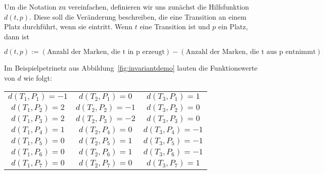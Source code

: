 		Um die Notation zu vereinfachen, definieren wir uns zunächst die Hilfsfunktion $d(t,p)$. Diese soll die Veränderung beschreiben, die eine Transition an einem Platz durchführt, wenn sie eintritt. Wenn $t$ eine Transition ist und $p$ ein Platz, dann ist 

		$$d(t,p) := (\text{Anzahl der Marken, die t in p erzeugt}) - (\text{Anzahl der Marken, die t aus p entnimmt})$$
		
		Im Beispielpetrinetz aus Abbildung~\ref{fig:invariantdemo} lauten die Funktionswerte von $d$ wie folgt:

		\begin{center}		
			\begin{tabular}{ccc}
				$d(T_1,P_1) = -1$ 	& $d(T_2,P_1) = 0$ 		& $d(T_3,P_1) = 1$ 		\\
				$d(T_1,P_2) = 2$ 	& $d(T_2,P_2) = -1$ 	& $d(T_3,P_2) = 0$ 		\\
				$d(T_1,P_3) = 2$ 	& $d(T_2,P_3) = -2$ 	& $d(T_3,P_3) = 0$ 		\\
				$d(T_1,P_4) = 1$ 	& $d(T_2,P_4) = 0$ 		& $d(T_3,P_4) = -1$ 	\\
				$d(T_1,P_5) = 0$ 	& $d(T_2,P_5) = 1$ 		& $d(T_3,P_5) = -1$ 	\\
				$d(T_1,P_6) = 0$ 	& $d(T_2,P_6) = 1$ 		& $d(T_3,P_6) = -1$ 	\\
				$d(T_1,P_7) = 0$ 	& $d(T_2,P_7) = 0$ 		& $d(T_3,P_7) = 1$ 		\\
			\end{tabular}
		\end{center}

